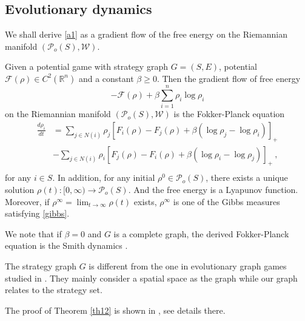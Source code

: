\documentclass[11pt,reqno]{amsart}
\begin{document}
\subsection{Evolutionary dynamics}\label{derivation}
We shall derive \eqref{a1} as a gradient flow of the free energy on the Riemannian manifold $(\mathcal{P}_o(S), \mathcal{W})$.
\begin{theorem}\label{th12}
Given a potential game with strategy graph $G=(S, E)$, potential $\mathcal{F}(\rho)\in C^2(\mathbb{R}^n)$ and a constant $\beta\geq 0$. Then the gradient flow of free energy
\begin{equation*}
-\mathcal{F}(\rho)+\beta\sum_{i=1}^n\rho_i\log\rho_i
\end{equation*}
 on the Riemannian manifold $(\mathcal{P}_o(S), \mathcal{W})$ is the Fokker-Planck equation 
\begin{equation*}
\begin{split}
\frac{ d\rho_i}{dt}&=\sum_{j\in N(i)} \rho_j[ F_i(\rho)- F_j(\rho)+\beta(\log\rho_j-\log\rho_i)]_+\\
&-\sum_{j\in N(i)}\rho_{i}[ F_j(\rho)- F_i(\rho)+\beta(\log\rho_i-\log\rho_j)]_+ \ ,\\
\end{split}
\end{equation*}
for any $i\in S$.
In addition, for any initial $\rho^0\in\mathcal{P}_o(S)$, there exists a unique solution $\rho(t): [0,\infty)\rightarrow \mathcal{P}_o(S)$. And the free energy is a Lyapunov function. Moreover, if $\rho^{\infty}=\lim_{t\rightarrow \infty }\rho(t)$ exists, $\rho^{\infty}$ is one of the Gibbs measures satisfying \eqref{gibbs}.
\end{theorem}
\begin{remark}
We note that if $\beta=0$ and $G$ is a complete graph, the derived Fokker-Planck equation is the Smith dynamics \cite{smith1984}. 
\end{remark}
\begin{remark}
 The strategy graph $G$ is different from the one in evolutionary graph games studied in \cite{allen2014games, lieberman2005evolutionary, graph}. They mainly consider a spatial space as the graph while our graph relates to the strategy set.
\end{remark}
The proof of Theorem \ref{th12} is shown in \cite{li-theory, li-thesis}, see details there.
\end{document}
